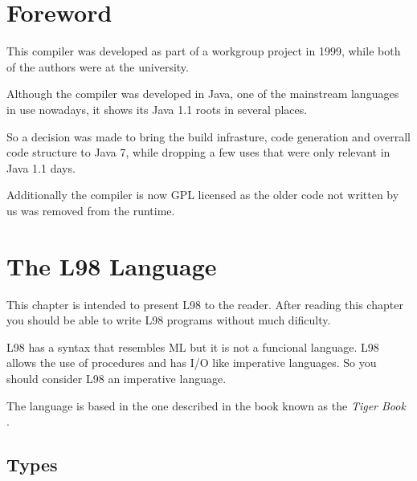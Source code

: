 \documentclass[a4paper, 11pt]{report}
\begin{document}
\lstset{language=ML}

\begin{titlepage}

\vspace{2cm}

\vspace{3cm}

\end{titlepage}

\tableofcontents

\chapter{Foreword}

This compiler was developed as part of a workgroup project in 1999, while both
of the authors were at the university.

Although the compiler was developed in Java, one of the mainstream languages in
use nowadays, it shows its Java 1.1 roots in several places.

So a decision was made to bring the build infrasture, code generation and overrall
code structure to Java 7, while dropping a few uses that were only relevant in Java
1.1 days.

Additionally the compiler is now GPL licensed as the older code not written
by us was removed from the runtime.

\chapter{The L98 Language}


This chapter is intended to present L98 to the reader. After reading this
chapter you should be able to write L98 programs without much dificulty.

L98 has a syntax that resembles ML but it is not a funcional language. L98
allows the use of procedures and has I/O like imperative languages. So you
should consider L98 an imperative language.

The language is based in the one described in the book known as the \emph{Tiger
Book} \cite{tiger}.

\section{Types}
\end{document}
